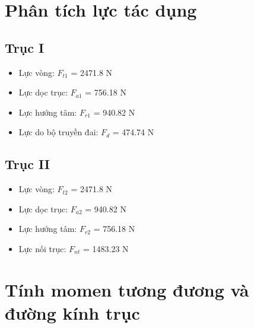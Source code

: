 \section{Phân tích lực tác dụng}
\subsection{Trục I}
\begin{itemize}
    \item Lực vòng: $F_{t1}$ = 2471.8 N
    \item Lực dọc trục: $F_{a1}$ = 756.18 N
    \item Lực hướng tâm: $F_{r1}$ = 940.82 N 
    \item Lực do bộ truyền đai: $F_d$ = 474.74 N
\end{itemize}
\subsection{Trục II}
\begin{itemize}
    \item Lực vòng: $F_{t2}$ = 2471.8 N
    \item Lực dọc trục: $F_{a2}$ = 940.82 N
    \item Lực hướng tâm: $F_{r2}$ = 756.18 N 
    \item Lực nối trục: $F_{nt}$ = 1483.23 N
\end{itemize}
\section{Tính momen tương đương và đường kính trục}
